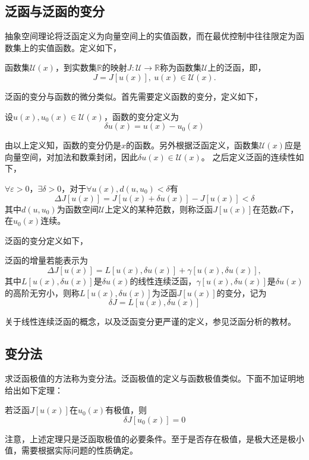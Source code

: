 \subsection{泛函与泛函的变分}
抽象空间理论将泛函定义为向量空间上的实值函数，而在最优控制中往往限定为函数集上的实值函数。定义如下，
\begin{definition}[泛函]
函数集$\mathcal{U}(x)$，到实数集$\mathbb{R}$的映射$J: \mathcal{U}\rightarrow \mathbb{R}$称为函数集$\mathcal{U}$上的{\heiti 泛函}，即，
\begin{equation}
J=J[u(x)], \ u(x)\in \mathcal{U}(x).
\end{equation}
\end{definition}
泛函的变分与函数的微分类似。首先需要定义函数的变分，定义如下，
\begin{definition}[函数的变分]
设$u(x), u_0(x) \in \mathcal{U}(x)$，{\heiti 函数的变分}定义为
\begin{equation}
\delta u(x)=u(x) - u_0(x)
\end{equation}
\end{definition}
由以上定义知，函数的变分仍是$x$的函数。另外根据泛函定义，函数集$\mathcal{U}(x)$应是向量空间，对加法和数乘封闭，因此$\delta u(x)\in \mathcal{U}(x)$。
之后定义泛函的连续性如下，
\begin{definition}[泛函的连续性]
$\forall \varepsilon > 0$，$\exists \delta > 0$，对于$\forall u(x), d(u,u_0)<\delta$有
\begin{equation}
\Delta J[u(x)]=J[u(x)+\delta u(x)]-J[u(x)] < \delta
\end{equation}
其中$d(u,u_0)$为函数空间$\mathcal{U}$上定义的某种范数，则称泛函$J[u(x)]$在范数$d$下，在$u_0(x)$连续。
\end{definition}
泛函的变分定义如下，
\begin{definition}[泛函的变分]
泛函的增量若能表示为
\begin{equation}
\Delta J[u(x)]=L[u(x),\delta u(x)] + \gamma[u(x), \delta u(x)],
\end{equation}
其中$L[u(x),\delta u(x)]$是$\delta u(x)$的线性连续泛函，$\gamma[u(x), \delta u(x)]$是$\delta u(x)$的高阶无穷小，则称$L[u(x),\delta u(x)]$为泛函$J[u(x)]$的变分，记为
\begin{equation}
\delta J = L[u(x),\delta u(x)]
\end{equation}
\end{definition}
关于线性连续泛函的概念，以及泛函变分更严谨的定义，参见泛函分析的教材\cite{PETERD2007Functional}。

\subsection{变分法}
求泛函极值的方法称为变分法。泛函极值的定义与函数极值类似。下面不加证明地给出如下定理：
\begin{theorem}
若泛函$J[u(x)]$在$u_0(x)$有极值，则
\begin{equation}
\delta J[u_0(x)]=0
\end{equation}
\end{theorem}
注意，上述定理只是泛函取极值的必要条件。至于是否存在极值，是极大还是极小值，需要根据实际问题的性质确定。


